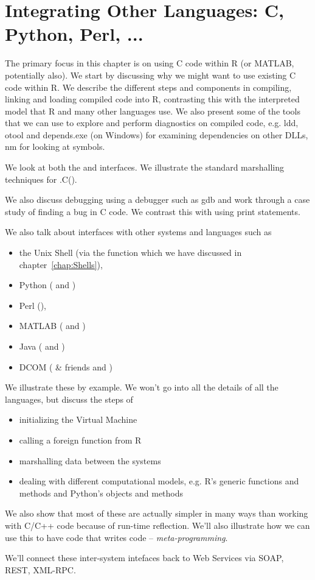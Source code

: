 \chapter{Integrating Other Languages: C, Python, Perl, ...}

\begin{summary}
The primary focus in this chapter is on using C code within R (or
MATLAB, potentially also).  We start by discussing why we might want
to use existing C code within R.  We describe the different steps and
components in compiling, linking and loading compiled code into R,
contrasting this with the interpreted model that R and many other languages
use. We also present some of the tools that we can use to explore and
perform diagnostics on compiled code, e.g. ldd, otool and depends.exe
(on Windows) for examining dependencies on other DLLs,
nm for looking at symbols.

We look at both the  and  interfaces.
We illustrate the standard marshalling techniques for .C().

We also discuss debugging using a debugger such as gdb
and work through a case study of finding a bug in C code.
We contrast this with using print statements.


We also talk about interfaces with other
systems and languages such as 
\begin{itemize}
\item the Unix Shell (via the  function which we have discussed in chapter~\ref{chap:Shells}),
\item Python ( and )
\item Perl (), 
\item MATLAB ( and )
\item Java ( and )
\item DCOM  ( \& friends and )
\end{itemize}
We illustrate these by example. We won't go into all the details of
all the languages, but discuss the steps of 
\begin{itemize}
\item initializing the Virtual Machine
\item calling a foreign function from R
\item marshalling data between the systems
\item dealing with different computational models, e.g. R's generic
  functions and methods  and Python's objects and methods
\end{itemize}
We also show that most of these are actually simpler in many ways than
working with C/C++ code because of run-time reflection.
We'll also illustrate how we can use this to have code that writes
code -- \textit{meta-programming}.

We'll connect these inter-system intefaces back to Web Services via
SOAP, REST, XML-RPC.
\end{summary}

